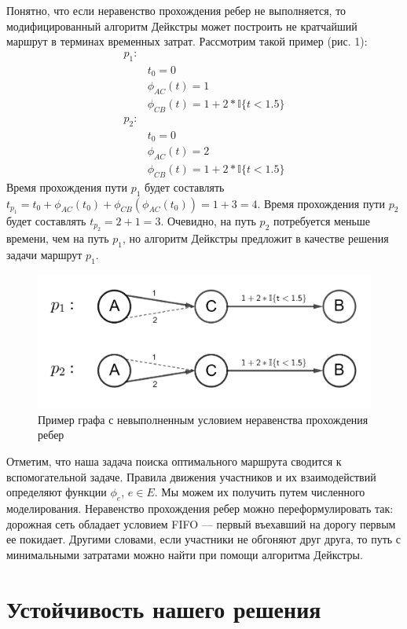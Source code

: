 \documentclass[12pt, a4paper]{article}
\begin{document}
Понятно, что если неравенство прохождения ребер не выполняется, то модифицированный алгоритм Дейкстры может построить не кратчайший маршрут в терминах временных затрат. Рассмотрим такой пример (рис. 1):
\begin{align*}
	p_1: & \\
	& t_0 = 0 \\
	& \phi_{AC}(t) = 1  \\
	& \phi_{CB}(t) = 1 + 2 * \mathbb{I} \{t < 1.5\} \\
	p_2: & \\
	& t_0 = 0 \\
	& \phi_{AC}(t) = 2  \\
	& \phi_{CB}(t) = 1 + 2 * \mathbb{I} \{t < 1.5\} 
\end{align*}
Время прохождения пути $p_1$ будет составлять $t_{p_1} = t_0 + \phi_{AC}(t_0) + \phi_{CB}(\phi_{AC}(t_0)) = 1 + 3 = 4 $. Время прохождения пути $p_2$ будет составлять $t_{p_2} = 2 + 1 = 3 $. Очевидно, на путь $p_2$ потребуется меньше времени, чем на путь $p_1$, но алгоритм Дейкстры предложит в качестве решения задачи маршрут $p_1$.

\begin{figure}[!hbp]
	\centering
		\includegraphics[scale=0.2]{graph_2.png}
	\caption{Пример графа с невыполненным условием неравенства прохождения ребер}
\end{figure}

Отметим, что наша задача поиска оптимального маршрута сводится к вспомогательной задаче. Правила движения участников и их взаимодействий определяют функции $\phi_e$, $e \in E $. Мы можем их получить путем численного моделирования. Неравенство прохождения ребер можно переформулировать так: дорожная сеть обладает условием FIFO --- первый въехавший на дорогу первым ее покидает. Другими словами, если участники не обгоняют друг друга, то путь с минимальными затратами можно найти при помощи алгоритма Дейкстры.


\newpage
\section*{Устойчивость нашего решения}
\end{document}
